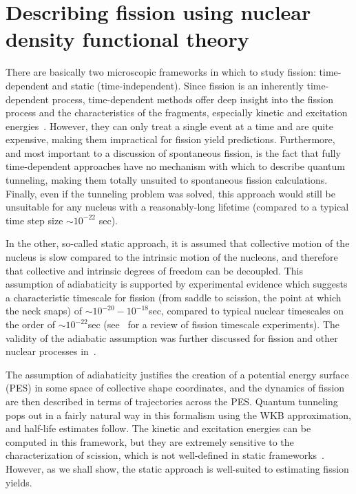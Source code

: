 \chapter{Describing fission using nuclear density functional theory}\label{chap:Model}


There are basically two microscopic frameworks in which to study fission: time-dependent and static (time-independent). Since fission is an inherently time-dependent process, time-dependent methods offer deep insight into the fission process and the characteristics of the fragments, especially kinetic and excitation energies~\cite{Scamps2019, Scamps2015a, Simenel2014, Bulgac2016a, Umar2010}. However, they can only treat a single event at a time and are quite expensive, making them impractical for fission yield predictions. Furthermore, and most important to a discussion of spontaneous fission, is the fact that fully time-dependent approaches have no mechanism with which to describe quantum tunneling, making them totally unsuited to spontaneous fission calculations. Finally, even if the tunneling problem was solved, this approach would still be unsuitable for any nucleus with a reasonably-long lifetime (compared to a typical time step size ${\sim}10^{-22}$ sec).

In the other, so-called static approach, it is assumed that collective motion of the nucleus is slow compared to the intrinsic motion of the nucleons, and therefore that collective and intrinsic degrees of freedom can be decoupled. This assumption of adiabaticity is supported by experimental evidence which suggests a characteristic timescale for fission (from saddle to scission, the point at which the neck snaps) of ${\sim}10^{-20}-10^{-18}$sec, compared to typical nuclear timescales on the order of ${\sim}10^{-22}$sec (see~\cite{Jacquet2009} for a review of fission timescale experiments). The validity of the adiabatic assumption was further discussed for fission and other nuclear processes in~\cite{Nazarewicz1993}.

The assumption of adiabaticity justifies the creation of a potential energy surface (PES) in some space of collective shape coordinates, and the dynamics of fission are then described in terms of trajectories across the PES. Quantum tunneling pops out in a fairly natural way in this formalism using the WKB approximation, and half-life estimates follow. The kinetic and excitation energies can be computed in this framework, but they are extremely sensitive to the characterization of scission, which is not well-defined in static frameworks~\cite{Younes2011}. However, as we shall show, the static approach is well-suited to estimating fission yields.

